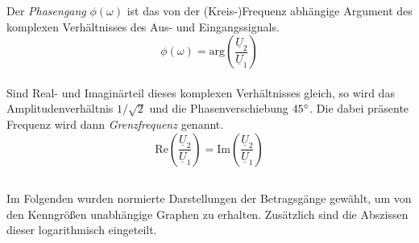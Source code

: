 \documentclass[a4paper, 12pt]{article}
\begin{document}
  Der \emph{Phasengang} $\phi(\omega)$ ist das von der (Kreis-)Frequenz abhängige Argument des komplexen Verhältnisses des Aus- und Eingangssignals.
  $$\phi(\omega) = \text{arg} \left( \frac{ \underline{U}_2 }{ \underline{U}_1 } \right)$$\\

  Sind Real- und Imaginärteil dieses komplexen Verhältnisses gleich, so wird das Amplitudenverhältnis $1/\sqrt{2}$ und die Phasenverschiebung $45 \degree$. Die dabei präsente Frequenz wird dann \emph{Grenzfrequenz} genannt.
  $$ \text{Re}\left( \frac{ \underline{U}_2 }{ \underline{U}_1 } \right) = \text{Im}\left( \frac{ \underline{U}_2 }{ \underline{U}_1 } \right)$$

\subsection{}
  Im Folgenden wurden normierte Darstellungen der Betragsgänge gewählt, um von den Kenngrößen unabhängige Graphen zu erhalten. Zusätzlich sind die Abszissen dieser logarithmisch eingeteilt.
\end{document}
